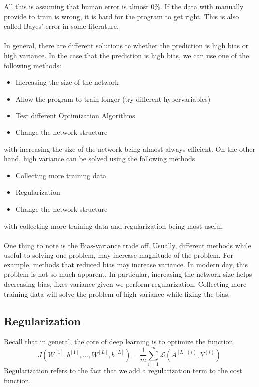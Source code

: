 \documentclass[a4paper]{article}
\begin{document}
All this is assuming that human error is almost $0\%$. If the data with manually provide to train is wrong, it is hard for the program to get right. This is also called Bayes' error in some literature. \\~\\
In general, there are different solutions to whether the prediction is high bias or high variance. In the case that the prediction is high bias, we can use one of the following methods: 
\begin{itemize}
\item Increasing the size of the network
\item Allow the program to train longer (try different hypervariables)
\item Test different Optimization Algorithms
\item Change the network structure
\end{itemize}
with increasing the size of the network being almost always efficient. On the other hand, high variance can be solved using the following methods 
\begin{itemize}
\item Collecting more training data
\item Regularization
\item Change the network structure
\end{itemize}
with collecting more training data and regularization being most useful. \\~\\
One thing to note is the Bias-variance trade off. Usually, different methods while useful to solving one problem, may increase magnitude of the problem. For example, methods that reduced bias may increase variance. In modern day, this problem is not so much apparent. In particular, increasing the network size helps decreasing bias, fixes variance given we perform regularization. Collecting more training data will solve the problem of high variance while fixing the bias. 

\subsection{Regularization}
Recall that in general, the core of deep learning is to optimize the function $$J(W^{[1]},b^{[1]},\dots,W^{[L]},b^{[L]})=\frac{1}{m}
\sum_{i=1}^m\mathcal{L}(A^{[L](i)},Y^{(i)})$$ Regularization refers to the fact that we add a regularization term to the cost function. 
\end{document}
